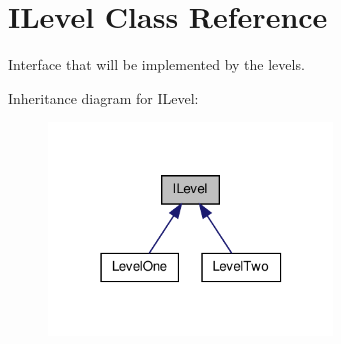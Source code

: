 \hypertarget{class_i_level}{\section{I\-Level Class Reference}
\label{class_i_level}
}


Interface that will be implemented by the levels.  




Inheritance diagram for I\-Level\-:\nopagebreak
\begin{figure}[H]
\begin{center}
\leavevmode
\includegraphics[width=214pt]{class_i_level__inherit__graph}
\end{center}
\end{figure}
